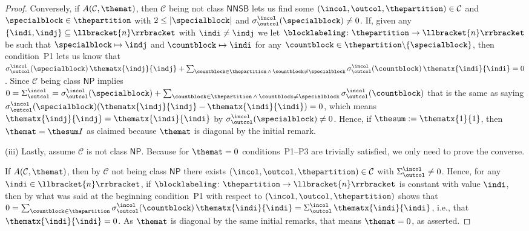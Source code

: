 \documentclass[10pt,a4paper]{amsart}
\numberwithin{equation}{section}
\newcommand{\identitymatrix}{I}
\newcommand{\Sand}{\,\wedge\,}
\newcommand{\dwi}[1]{\llbracket{#1}\rrbracket}
\newcommand{\xfromto}[3]{#1 \colon  #2 \to #3}
\newcommand{\tcsx}[2]{\Sigma^{#1}_{#2}}
\newcommand{\csx}[3]{\sigma^{#1}_{#2}(#3)}
\newcommand{\thedim}{n}
\newcommand{\thecat}{\mathcal{C}}
\newcommand{\thepredicatex}[2]{A(#1,#2)}
\newcommand{\conditionone}{P1}
\newcommand{\conditionthree}{P3}
\newcommand{\onlyneutralnonsingletonblocks}{\mathsf{NNSB}}
\newcommand{\onlyneutralpartitions}{\mathsf{NP}}
\begin{document}
{\begin{proof}
Conversely, if $\thepredicatex{\thecat}{\themat}$, then
$\thecat$ being not class $\onlyneutralnonsingletonblocks$ lets us find some $(\incol,\outcol,\thepartition)\in\thecat$ and $\specialblock\in\thepartition$ with $2\leq |\specialblock|$ and $\csx{\incol}{\outcol}{\specialblock}\neq 0$. If, given any $\{\indi,\indj\}\subseteq \dwi{\thedim}$ with $\indi\neq \indj$ we let $\xfromto{\blocklabeling}{\thepartition}{\dwi{\thedim}}$ be such that $\specialblock\mapsto \indj$ and $\countblock\mapsto\indi$ for any $\countblock\in\thepartition\backslash \{\specialblock\}$, then
con\-di\-tion~\conditionone{} lets us know that $\csx{\incol}{\outcol}{\specialblock}\,\thematx{\indj}{\indj}+\sum_{\countblock\in\thepartition\Sand \countblock\neq \specialblock}\csx{\incol}{\outcol}{\countblock}\,\thematx{\indi}{\indi}=0$. Since $\thecat$ being class $\onlyneutralpartitions$ implies $0=\tcsx{\incol}{\outcol}=\csx{\incol}{\outcol}{\specialblock}+\sum_{\countblock\in\thepartition\Sand \countblock\neq \specialblock}\csx{\incol}{\outcol}{\countblock}$  that is the same as saying $\csx{\incol}{\outcol}{\specialblock}(\thematx{\indj}{\indj}-\thematx{\indi}{\indi})=0$, which means $\thematx{\indj}{\indj}=\thematx{\indi}{\indi}$ by $\csx{\incol}{\outcol}{\specialblock}\neq 0$. Hence, if $\thesum:=\thematx{1}{1}$, then $\themat=\thesum\identitymatrix$ as claimed because $\themat$ is diagonal by the initial remark.

(iii) Lastly, assume $\thecat$ is not class  $\onlyneutralpartitions$. Because for $\themat=0$  con\-di\-tions~\conditionone{}--\conditionthree{} are trivially satisfied, we only need to prove the converse.

  If $\thepredicatex{\thecat}{\themat}$, then by $\thecat$ not being class  $\onlyneutralpartitions$ there exists $(\incol,\outcol,\thepartition)\in\thecat$ with $\tcsx{\incol}{\outcol}\neq 0$. Hence, for any $\indi\in\dwi{\thedim}$, if $\xfromto{\blocklabeling}{\thepartition}{\dwi{\thedim}}$ is constant with value $\indi$, then by what was said at the beginning con\-di\-tion~\conditionone{} with respect to $(\incol,\outcol,\thepartition)$ shows that $0=\sum_{\countblock\in\thepartition}\csx{\incol}{\outcol}{\countblock}\, \thematx{\indi}{\indi}=\tcsx{\incol}{\outcol}\,\thematx{\indi}{\indi}$, i.e., that $\thematx{\indi}{\indi}=0$. As $\themat$ is diagonal by the same initial remarks, that means $\themat=0$, as asserted.
\end{proof}


}
\end{document}
